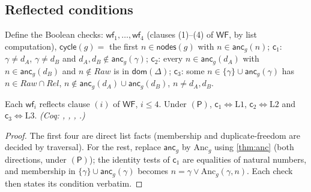 \subsection{Reflected conditions}
Define the Boolean checks: $\mathsf{wf}_1,\dots,\mathsf{wf}_4$ (clauses (1)--(4) of $\mathsf{WF}$, by list computation), $\mathsf{cycle}(g) = $ the first $n \in \mathsf{nodes}(g)$ with $n \in \mathsf{anc}_g(n)$; $\mathsf{c}_1$: $\gamma \neq d_A$, $\gamma \neq d_B$ and $d_A,d_B \notin \mathsf{anc}_g(\gamma)$; $\mathsf{c}_2$: every $n \in \mathsf{anc}_g(d_A)$ with $n \in \mathsf{anc}_g(d_B)$ and $n \notin \mathit{Raw}$ is in $\mathsf{dom}(\Delta)$; $\mathsf{c}_3$: some $n \in \{\gamma\} \cup \mathsf{anc}_g(\gamma)$ has $n \in \mathit{Raw} \cap \mathit{Rel}$, $n \notin \mathsf{anc}_g(d_A) \cup \mathsf{anc}_g(d_B)$, $n \neq d_A, d_B$.
\begin{lem}\label{lem:reflect}
Each $\mathsf{wf}_i$ reflects clause $(i)$ of $\mathsf{WF}$, $i \le 4$. Under $(\mathsf{P})$, $\mathsf{c}_1 \Leftrightarrow \mathrm{L1}$, $\mathsf{c}_2 \Leftrightarrow \mathrm{L2}$ and $\mathsf{c}_3 \Leftrightarrow \mathrm{L3}$. \emph{(Coq: , , , .)}
\end{lem}
\begin{proof}
The first four are direct list facts (membership and duplicate-freedom are decided by traversal). For the rest, replace $\mathsf{anc}_g$ by $\mathrm{Anc}_g$ using \cref{thm:anc} (both directions, under $(\mathsf{P})$); the identity tests of $\mathsf{c}_1$ are equalities of natural numbers, and membership in $\{\gamma\} \cup \mathsf{anc}_g(\gamma)$ becomes $n = \gamma \lor \mathrm{Anc}_g(\gamma,n)$. Each check then states its condition verbatim.
\end{proof}

